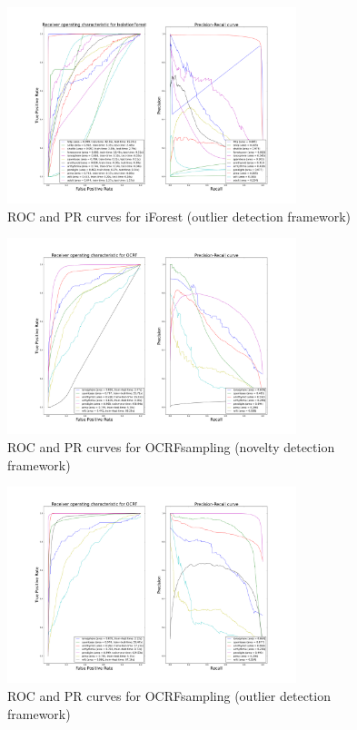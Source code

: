 \begin{figure}[!ht]
    \caption{\acs{ROC} and \acs{PR} curves for \acs{iForest} (outlier detection
    framework)}
    \label{ocrf:fig:iforest_roc_pr_unsupervised}
    \centering
    \includegraphics[trim=175 80 175 123, clip,
    width=0.75\textwidth]{./gfx/bench_iforest_roc_pr_unsupervised_factorized.png}
\end{figure}
\begin{figure}[!ht]
    \caption{\acs{ROC} and \acs{PR} curves for \acs{OCRFsampling} (novelty
    detection framework)}
    \label{ocrf:fig:ocrfm_roc_pr}
    \centering
    \includegraphics[trim=175 80 175 123, clip,
    width=0.75\textwidth]{./gfx/bench_ocrf_roc_pr_supervised_factorized.png}
\end{figure}
\begin{figure}[!ht]
    \caption{\acs{ROC} and \acs{PR} curves for \acs{OCRFsampling} (outlier
    detection framework)}
    \label{ocrf:fig:ocrfm_roc_pr_unsupervised}
    \centering
    \includegraphics[trim=175 80 175 123, clip,
    width=0.75\textwidth]{./gfx/bench_ocrf_roc_pr_unsupervised_factorized.png}
\end{figure}

